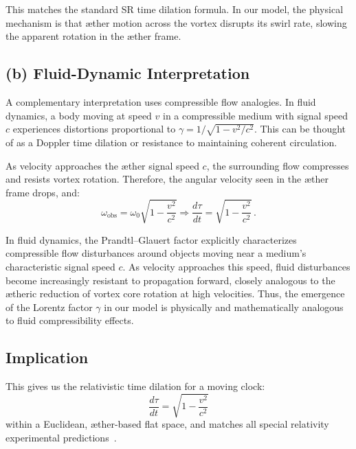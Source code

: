This matches the standard SR time dilation formula. In our model, the physical mechanism is that æther motion across the vortex disrupts its swirl rate, slowing the apparent rotation in the æther frame.

\subsection*{(b) Fluid-Dynamic Interpretation}

A complementary interpretation uses compressible flow analogies. In fluid dynamics, a body moving at speed $v$ in a compressible medium with signal speed $c$ experiences distortions proportional to $\gamma = 1/\sqrt{1 - v^2/c^2}$. This can be thought of as a Doppler time dilation or resistance to maintaining coherent circulation. 

As velocity approaches the æther signal speed $c$, the surrounding flow compresses and resists vortex rotation. Therefore, the angular velocity seen in the æther frame drops, and:
\[
\omega_{\text{obs}} = \omega_0 \sqrt{1 - \frac{v^2}{c^2}} \Rightarrow \frac{d\tau}{dt} = \sqrt{1 - \frac{v^2}{c^2}} \,. \tag{3}
\]


In fluid dynamics, the Prandtl–Glauert factor explicitly characterizes compressible flow disturbances around objects moving near a medium’s characteristic signal speed $c$. As velocity approaches this speed, fluid disturbances become increasingly resistant to propagation forward, closely analogous to the ætheric reduction of vortex core rotation at high velocities. Thus, the emergence of the Lorentz factor $\gamma$ in our model is physically and mathematically analogous to fluid compressibility effects.


\subsection*{Implication}

This gives us the relativistic time dilation for a moving clock:
\[
\boxed{\frac{d\tau}{dt} = \sqrt{1 - \frac{v^2}{c^2}}}
\]
within a Euclidean, æther-based flat space, and matches all special relativity experimental predictions~\cite{Rado2020-aether-Lorentz,Levy2009-aether-clock}.